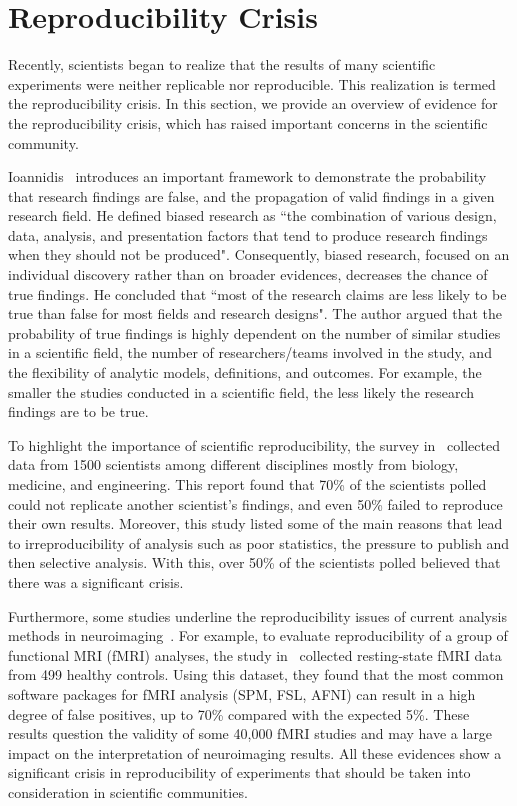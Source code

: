 \section{Reproducibility Crisis}

Recently, scientists began to realize that the results of many 
scientific experiments were neither replicable nor reproducible. This 
realization is termed the reproducibility crisis. In this section, 
we provide an overview of evidence for the
reproducibility crisis, which has raised important concerns in the 
scientific community.

Ioannidis~\cite{ioannidis2005most} introduces an important framework to 
demonstrate the probability that research findings are false, and the 
propagation of valid findings in a given research field. He defined 
biased research as ``the combination of various design, data, analysis, 
and presentation factors that tend to produce research findings when 
they should not be produced". Consequently, biased research, focused on 
an individual discovery rather than on broader evidences, decreases the 
chance of true findings. He concluded that ``most of the research 
claims are less likely to be true than false for most fields and 
research designs". The author argued that the probability of true 
findings is highly dependent on the number of similar studies in a 
scientific field, the number of researchers/teams involved in the study, 
and the flexibility of analytic models, definitions, and outcomes. For 
example, the smaller the studies conducted in a scientific field, the 
less likely the research findings are to be true. 

To highlight the importance of scientific reproducibility, the survey 
in~\cite{baker20161} collected data from 1500 scientists among 
different disciplines mostly from  biology, medicine, and engineering. 
This report found that 70\% of the scientists polled could not 
replicate another scientist's findings, and even 50\% failed to 
reproduce their own results. Moreover, this study listed some of 
the main reasons that lead to irreproducibility of analysis 
such as poor statistics, the pressure to publish 
and then selective analysis. 
With this, over 50\% of the scientists polled believed that there was a 
significant crisis.

Furthermore, some studies underline the reproducibility issues of 
current analysis methods in neuroimaging~\cite{jovicich2009mri, 
muller2017altered, eklund2016cluster}. For example, to evaluate 
reproducibility of a group of functional MRI (fMRI) analyses, the study 
in~\cite{eklund2016cluster} collected resting-state fMRI data from 499 
healthy controls. Using this dataset, they found that the most common 
software packages for fMRI analysis (SPM, FSL, AFNI) can result in a 
high degree of false positives, up to 70\% compared with the expected 
5\%. These results question the validity of some 40,000 fMRI studies 
and may have a large impact on the interpretation of neuroimaging 
results. All these evidences show a significant crisis in 
reproducibility of experiments that should be taken into consideration in 
scientific communities.

